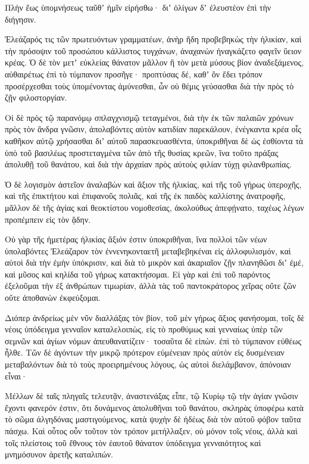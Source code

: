 {Πλὴν ἕως ὑπομνήσεως ταῦθʼ ἡμῖν εἰρήσθω· διʼ ὀλίγων δʼ ἐλευστέον ἐπὶ τὴν διήγησιν.
\par }{\PP {}Ἐλεάζαρός τις τῶν πρωτευόντων γραμματέων, ἀνὴρ ἤδη προβεβηκὼς τὴν ἡλικίαν, καὶ τὴν πρόσοψιν τοῦ προσώπου κάλλιστος τυγχάνων, ἀναχανὼν ἠναγκάζετο φαγεῖν ὕειον κρέας.
Ὁ δὲ τὸν μετʼ εὐκλείας θάνατον μᾶλλον ἢ τὸν μετὰ μύσους βίον ἀναδεξάμενος, αὐθαιρέτως ἐπὶ τὸ τύμπανον προσῆγε·
προπτύσας δέ, καθʼ ὃν ἔδει τρόπον προσέρχεσθαι τοὺς ὑπομένοντας ἀμύνεσθαι, ὧν οὐ θέμις γεύσασθαι διὰ τὴν πρὸς τὸ ζῇν φιλοστοργίαν.
\par }{\PP {}Οἱ δὲ πρὸς τῷ παρανόμῳ σπλαγχνισμῷ τεταγμένοι, διὰ τὴν ἐκ τῶν παλαιῶν χρόνων πρὸς τὸν ἄνδρα γνῶσιν, ἀπολαβόντες αὐτὸν κατιδίαν παρεκάλουν, ἐνέγκαντα κρέα οἷς καθῆκον αὐτῷ χρήσασθαι διʼ αὐτοῦ παρασκευασθέντα, ὑποκριθῆναι δὲ ὡς ἐσθίοντα τὰ ὑπὸ τοῦ βασιλέως προστεταγμένα τῶν ἀπὸ τῆς θυσίας κρεῶν,
ἵνα τοῦτο πράξας ἀπολυθῇ τοῦ θανάτου, καὶ διὰ τὴν ἀρχαίαν πρὸς αὐτοὺς φιλίαν τύχῃ φιλανθρωπίας.
\par }{\PP {}Ὁ δὲ λογισμὸν ἀστεῖον ἀναλαβὼν καὶ ἄξιον τῆς ἡλικίας, καὶ τῆς τοῦ γήρως ὑπεροχῆς, καὶ τῆς ἐπικτήτου καὶ ἐπιφανοῦς πολιᾶς, καὶ τῆς ἐκ παιδὸς καλλίστης ἀνατροφῆς, μᾶλλον δὲ τῆς ἁγίας καὶ θεοκτίστου νομοθεσίας, ἀκολούθως ἀπεφῄνατο, ταχέως λέγων προπέμπειν εἰς τὸν ᾅδην.
\par }{\PP {}Οὐ γὰρ τῆς ἡμετέρας ἡλικίας ἄξιόν ἐστιν ὑποκριθῆναι, ἵνα πολλοὶ τῶν νέων ὑπολαβόντες Ἐλεάζαρον τὸν ἐννενηκονταετῆ μεταβεβηκέναι εἰς ἀλλοφυλισμόν,
καὶ αὐτοὶ διὰ τὴν ἐμὴν ὑπόκρισιν, καὶ διὰ τὸ μικρὸν καὶ ἀκαριαῖον ζῇν πλανηθῶσι διʼ ἐμέ, καὶ μῦσος καὶ κηλίδα τοῦ γήρως κατακτήσομαι.
Εἰ γὰρ καὶ ἐπὶ τοῦ παρόντος ἐξελοῦμαι τὴν ἐξ ἀνθρώπων τιμωρίαν, ἀλλὰ τὰς τοῦ παντοκράτορος χεῖρας οὔτε ζῶν οὔτε ἀποθανὼν ἐκφεύξομαι.
\par }{\PP {}Διόπερ ἀνδρείως μὲν νῦν διαλλάξας τὸν βίον, τοῦ μὲν γήρως ἄξιος φανήσομαι,
τοῖς δὲ νέοις ὑπόδειγμα γενναῖον καταλελοιπὼς, εἰς τὸ προθύμως καὶ γενναίως ὑπὲρ τῶν σεμνῶν καὶ ἁγίων νόμων ἀπευθανατίζειν· τοσαῦτα δὲ εἰπὼν. ἐπὶ τὸ τύμπανον εὐθέως ἦλθε.
Τῶν δὲ ἀγόντων τὴν μικρῷ πρότερον εὐμένειαν πρὸς αὐτὸν εἰς δυσμένειαν μεταβαλόντων διὰ τὸ τοὺς προειρημένους λόγους, ὡς αὐτοὶ διελάμβανον, ἀπόνοιαν εἶναι·
\par }{\PP {}Μέλλων δὲ ταῖς πληγαῖς τελευτᾷν, ἀναστενάξας εἶπε, τῷ Κυρίῳ τῷ τὴν ἁγίαν γνῶσιν ἔχοντι φανερόν ἐστιν, ὅτι δυνάμενος ἀπολυθῆναι τοῦ θανάτου, σκληρὰς ὑποφέρω κατὰ τὸ σῶμα ἀλγηδόνας μαστιγούμενος, κατὰ ψυχὴν δὲ ἡδέως διὰ τὸν αὐτοῦ φόβον ταῦτα πάσχω.
Καὶ οὗτος οὖν τοῦτον τὸν τρόπον μετήλλαξεν, οὐ μόνον τοῖς νέοις, ἀλλὰ καὶ τοῖς πλείστοις τοῦ ἔθνους τὸν ἑαυτοῦ θάνατον ὑπόδειγμα γενναιότητος καὶ μνημόσυνον ἀρετῆς καταλιπών.

}
